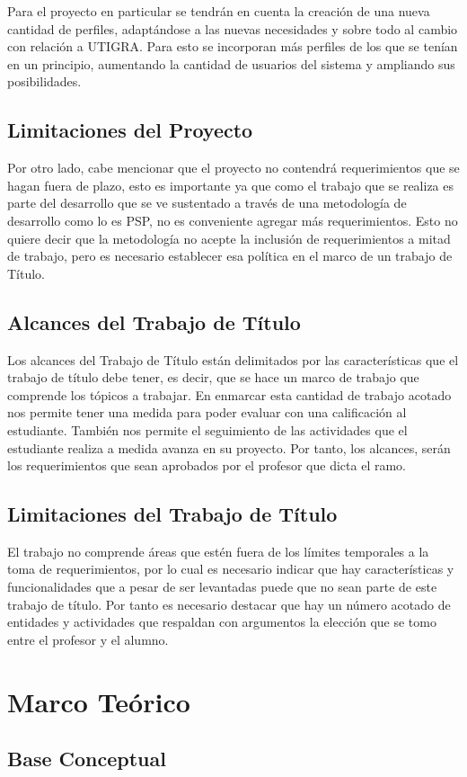 \documentclass[a4paper,12pt,openany,oneside]{book}
\begin{document}
Para el proyecto en particular se tendrán en cuenta la creación de una nueva cantidad de perfiles, adaptándose a las nuevas necesidades y sobre todo al cambio con relación a UTIGRA. Para esto se incorporan más perfiles de los que se tenían en un principio, aumentando la cantidad de usuarios del sistema y ampliando sus posibilidades.
\section{Limitaciones del Proyecto}
Por otro lado, cabe mencionar que el proyecto no contendrá requerimientos que se hagan fuera de plazo, esto es importante ya que como el trabajo que se realiza es parte del desarrollo que se ve sustentado a través de una metodología de desarrollo como lo es PSP, no es conveniente agregar más requerimientos. Esto no quiere decir que la metodología no acepte la inclusión de requerimientos a mitad de trabajo, pero es necesario establecer esa política en el marco de un trabajo de Título.
\section{Alcances del Trabajo de Título}
Los alcances del Trabajo de Título están delimitados por las características que el trabajo de título debe tener, es decir, que se hace un marco de trabajo que comprende los tópicos a trabajar. En enmarcar esta cantidad de trabajo acotado nos permite tener una medida para poder evaluar con una calificación al estudiante. También nos permite el seguimiento de las actividades que el estudiante realiza a medida avanza en su proyecto. Por tanto, los alcances, serán los requerimientos que sean aprobados por el profesor que dicta el ramo.
\section{Limitaciones del Trabajo de Título}
El trabajo no comprende áreas que estén fuera de los límites temporales a la toma de requerimientos, por lo cual es necesario indicar que hay características y funcionalidades que a pesar de ser levantadas puede que no sean parte de este trabajo de título. Por tanto es necesario destacar que hay un número acotado de entidades y actividades que respaldan con argumentos la elección que se tomo entre el profesor y el alumno.
\chapter{Marco Teórico}
\thispagestyle{empty}
\section{Base Conceptual}
\end{document}
